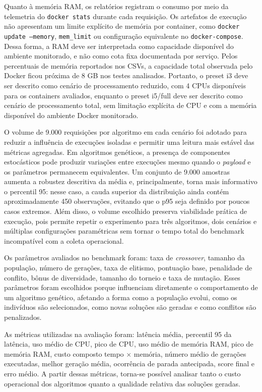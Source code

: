 Quanto à memória RAM, os relatórios registram o consumo por meio da telemetria do \texttt{docker stats} durante cada requisição. Os artefatos de execução não apresentam um limite explícito de memória por container, como \texttt{docker update --memory}, \texttt{mem\_limit} ou configuração equivalente no \texttt{docker-compose}. Dessa forma, a RAM deve ser interpretada como capacidade disponível do ambiente monitorado, e não como cota fixa documentada por serviço. Pelos percentuais de memória reportados nos CSVs, a capacidade total observada pelo Docker ficou próxima de 8 GB nos testes analisados. Portanto, o preset i3 deve ser descrito como cenário de processamento reduzido, com 4 CPUs disponíveis para os containers avaliados, enquanto o preset i5/full deve ser descrito como cenário de processamento total, sem limitação explícita de CPU e com a memória disponível do ambiente Docker monitorado.

O volume de 9.000 requisições por algoritmo em cada cenário foi adotado para reduzir a influência de execuções isoladas e permitir uma leitura mais estável das métricas agregadas. Em algoritmos genéticos, a presença de componentes estocásticos pode produzir variações entre execuções mesmo quando o \textit{payload} e os parâmetros permanecem equivalentes. Um conjunto de 9.000 amostras aumenta a robustez descritiva da média e, principalmente, torna mais informativo o percentil 95: nesse caso, a cauda superior da distribuição ainda contém aproximadamente 450 observações, evitando que o p95 seja definido por poucos casos extremos. Além disso, o volume escolhido preserva viabilidade prática de execução, pois permite repetir o experimento para três algoritmos, dois cenários e múltiplas configurações paramétricas sem tornar o tempo total do benchmark incompatível com a coleta operacional.

Os parâmetros avaliados no benchmark foram: taxa de \textit{crossover}, tamanho da população, número de gerações, taxa de elitismo, pontuação base, penalidade de conflito, bônus de diversidade, tamanho do torneio e taxa de mutação. Esses parâmetros foram escolhidos porque influenciam diretamente o comportamento de um algoritmo genético, afetando a forma como a população evolui, como os indivíduos são selecionados, como novas soluções são geradas e como conflitos são penalizados.

As métricas utilizadas na avaliação foram: latência média, percentil 95 da latência, uso médio de CPU, pico de CPU, uso médio de memória RAM, pico de memória RAM, custo composto tempo \(\times\) memória, número médio de gerações executadas, melhor geração média, ocorrência de parada antecipada, score final e erro médio. A partir dessas métricas, torna-se possível analisar tanto o custo operacional dos algoritmos quanto a qualidade relativa das soluções geradas.

